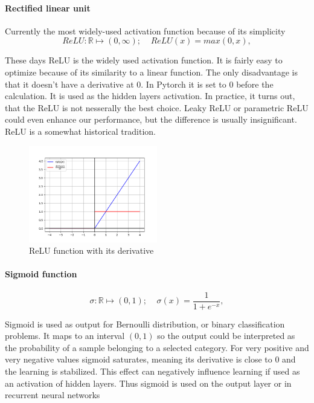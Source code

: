    \paragraph{Rectified linear unit}
    Currently the most widely-used activation function because of its simplicity 
    \begin{equation}
    \label{def: relu}
        ReLU: \mathbb{R} \mapsto (0,\infty); \; \; \; \; ReLU(x)=max(0, x), 
    \end{equation}
    \par These days ReLU is the widely used activation function. It is fairly easy to optimize because of its similarity to a linear function. The only disadvantage is that it doesn't have a derivative at 0. In Pytorch it is set to 0 before the calculation. It is used as the hidden layers activation. In practice, it turns out, that the ReLU is not nesserally the best choice. Leaky ReLU or parametric ReLU could even enhance our performance, but the difference is usually insignificant. ReLU is a somewhat historical tradition.
    \begin{figure}[h]
    \includegraphics[width=0.5\textwidth]{Images/relu.png}
    \centering
    \caption{ReLU function with its derivative}
    \label{relu graph}
    \end{figure}

    
    \paragraph{Sigmoid function}
    
    \begin{equation}
    \label{def: sigmoid}
        \sigma: \mathbb{R} \mapsto (0,1); \; \; \; \; \sigma(x)=\frac{1}{1+e^{-x}}, 
    \end{equation}
    
    \par Sigmoid is used as output for Bernoulli distribution, or binary classification problems. It maps to an interval $(0,1)$ so the output could be interpreted as the probability of a sample belonging to a selected category. For very positive and very negative values sigmoid saturates, meaning its derivative is close to 0 and the learning is stabilized. This effect can negatively influence learning if used as an activation of hidden layers. Thus sigmoid is used on the output layer or in recurrent neural networks
    
